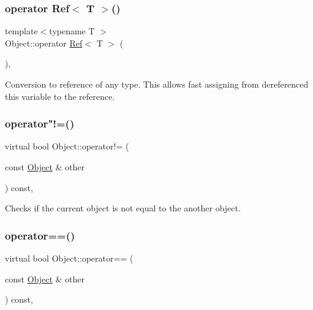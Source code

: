 \subsubsection{\texorpdfstring{operator Ref$<$ T $>$()}{operator Ref< T >()}}
{\footnotesize\ttfamily template$<$typename T $>$ \\
Object\+::operator \mbox{\hyperlink{class_ref}{Ref}}$<$ T $>$ (\begin{DoxyParamCaption}{ }\end{DoxyParamCaption})\hspace{0.3cm}{\ttfamily [inline]}, {\ttfamily [protected]}}



Conversion to reference of any type. This allows fast assigning from dereferenced this variable to the reference. 

\mbox{\label{class_object_afc552cc4f935b62c14c1453041ce4911}} 
\subsubsection{\texorpdfstring{operator"!=()}{operator!=()}}
{\footnotesize\ttfamily virtual bool Object\+::operator!= (\begin{DoxyParamCaption}\item[{const \mbox{\hyperlink{class_object}{Object}} \&}]{other }\end{DoxyParamCaption}) const\hspace{0.3cm}{\ttfamily [inline]}, {\ttfamily [virtual]}}



Checks if the current object is not equal to the another object. 

\mbox{\label{class_object_a735820b22a0356fe9afbae9e88b187d6}} 
\subsubsection{\texorpdfstring{operator==()}{operator==()}}
{\footnotesize\ttfamily virtual bool Object\+::operator== (\begin{DoxyParamCaption}\item[{const \mbox{\hyperlink{class_object}{Object}} \&}]{other }\end{DoxyParamCaption}) const\hspace{0.3cm}{\ttfamily [inline]}, {\ttfamily [virtual]}}



